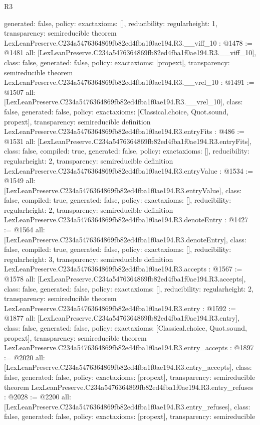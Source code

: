 \begin{lexlean}{R3}
\begin{coremodule}
{  generated: false,
  policy: exact{axioms: []},
  reducibility: regular{height: 1},
  transparency: semireducible
}
theorem LexLeanPreserve.C234a5476364869fb82ed4fba1f0ae194.R3.__viff_10 : @1478 := @1481 {
  all: [LexLeanPreserve.C234a5476364869fb82ed4fba1f0ae194.R3.__viff_10],
  class: false,
  generated: false,
  policy: exact{axioms: [propext]},
  transparency: semireducible
}
theorem LexLeanPreserve.C234a5476364869fb82ed4fba1f0ae194.R3.__vrel_10 : @1491 := @1507 {
  all: [LexLeanPreserve.C234a5476364869fb82ed4fba1f0ae194.R3.__vrel_10],
  class: false,
  generated: false,
  policy: exact{axioms: [Classical.choice, Quot.sound, propext]},
  transparency: semireducible
}
definition LexLeanPreserve.C234a5476364869fb82ed4fba1f0ae194.R3.entryFits : @486 := @1531 {
  all: [LexLeanPreserve.C234a5476364869fb82ed4fba1f0ae194.R3.entryFits],
  class: false,
  compiled: true,
  generated: false,
  policy: exact{axioms: []},
  reducibility: regular{height: 2},
  transparency: semireducible
}
definition LexLeanPreserve.C234a5476364869fb82ed4fba1f0ae194.R3.entryValue : @1534 := @1549 {
  all: [LexLeanPreserve.C234a5476364869fb82ed4fba1f0ae194.R3.entryValue],
  class: false,
  compiled: true,
  generated: false,
  policy: exact{axioms: []},
  reducibility: regular{height: 2},
  transparency: semireducible
}
definition LexLeanPreserve.C234a5476364869fb82ed4fba1f0ae194.R3.denoteEntry : @1427 := @1564 {
  all: [LexLeanPreserve.C234a5476364869fb82ed4fba1f0ae194.R3.denoteEntry],
  class: false,
  compiled: true,
  generated: false,
  policy: exact{axioms: []},
  reducibility: regular{height: 3},
  transparency: semireducible
}
definition LexLeanPreserve.C234a5476364869fb82ed4fba1f0ae194.R3.accepts : @1567 := @1578 {
  all: [LexLeanPreserve.C234a5476364869fb82ed4fba1f0ae194.R3.accepts],
  class: false,
  generated: false,
  policy: exact{axioms: []},
  reducibility: regular{height: 2},
  transparency: semireducible
}
theorem LexLeanPreserve.C234a5476364869fb82ed4fba1f0ae194.R3.entry : @1592 := @1877 {
  all: [LexLeanPreserve.C234a5476364869fb82ed4fba1f0ae194.R3.entry],
  class: false,
  generated: false,
  policy: exact{axioms: [Classical.choice, Quot.sound, propext]},
  transparency: semireducible
}
theorem LexLeanPreserve.C234a5476364869fb82ed4fba1f0ae194.R3.entry_accepts : @1897 := @2020 {
  all: [LexLeanPreserve.C234a5476364869fb82ed4fba1f0ae194.R3.entry_accepts],
  class: false,
  generated: false,
  policy: exact{axioms: [propext]},
  transparency: semireducible
}
theorem LexLeanPreserve.C234a5476364869fb82ed4fba1f0ae194.R3.entry_refuses : @2028 := @2200 {
  all: [LexLeanPreserve.C234a5476364869fb82ed4fba1f0ae194.R3.entry_refuses],
  class: false,
  generated: false,
  policy: exact{axioms: [propext]},
  transparency: semireducible
}


\end{coremodule}
\end{lexlean}
